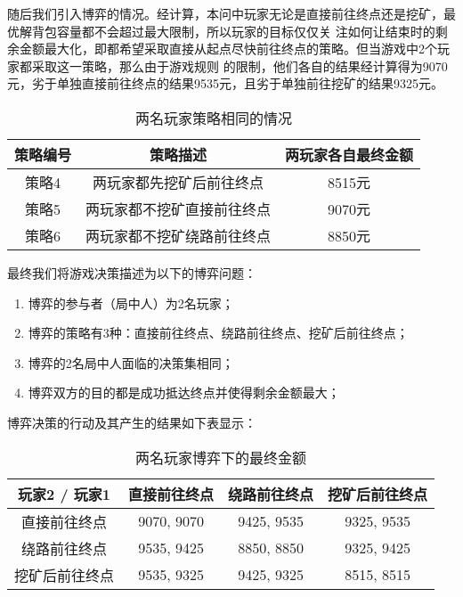 \documentclass[bwprint]{cumcmthesis} %
\begin{document}
随后我们引入博弈的情况。经计算，本问中玩家无论是直接前往终点还是挖矿，最优解背包容量都不会超过最大限制，所以玩家的目标仅仅关
注如何让结束时的剩余金额最大化，即都希望采取直接从起点尽快前往终点的策略。但当游戏中2个玩家都采取这一策略，那么由于游戏规则
的限制，他们各自的结果经计算得为9070元，劣于单独直接前往终点的结果9535元，且劣于单独前往挖矿的结果9325元。

\begin{table}[!htbp]
    \caption{两名玩家策略相同的情况}\label{tab:p5strategy1} 
    \centering
    \begin{tabular}{ccc}
        \toprule[1.5pt]
        策略编号 & 策略描述 & 两玩家各自最终金额 \\
        \midrule[1pt]
        策略4 & 两玩家都先挖矿后前往终点 & 8515元 \\
        策略5 & 两玩家都不挖矿直接前往终点 & 9070元\\
        策略6 & 两玩家都不挖矿绕路前往终点 & 8850元\\
        \bottomrule[1.5pt]
    \end{tabular}
\end{table}

最终我们将游戏决策描述为以下的博弈问题：
\begin{enumerate}
    \item 博弈的参与者（局中人）为2名玩家；
    \item 博弈的策略有3种：直接前往终点、绕路前往终点、挖矿后前往终点；
    \item 博弈的2名局中人面临的决策集相同；
    \item 博弈双方的目的都是成功抵达终点并使得剩余金额最大；
\end{enumerate}

博弈决策的行动及其产生的结果如下表显示：

\begin{table}[!htbp]
    \caption{两名玩家博弈下的最终金额}
    \centering
    \begin{tabular}{cccc}
        \toprule[1.5pt]
         玩家2 / 玩家1 & 直接前往终点 & 绕路前往终点 & 挖矿后前往终点  \\ 
        \midrule[1pt]
         直接前往终点 & 9070, 9070 & 9425, 9535 & 9325, 9535 \\ 
         绕路前往终点 & 9535, 9425 & 8850, 8850 & 9325, 9425 \\
         挖矿后前往终点 & 9535, 9325 & 9425, 9325 & 8515, 8515  \\  
        \bottomrule[1.5pt]
    \end{tabular}
\end{table}
\end{document}
